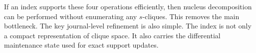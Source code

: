 If an index supports these four operations efficiently, then nucleus decomposition can be performed without enumerating any $s$-cliques.
%
This removes the main bottleneck.
%
The key journal-level refinement is also simple.
%
The index is not only a compact representation of clique space.
%
It also carries the differential maintenance state used for exact support updates.




